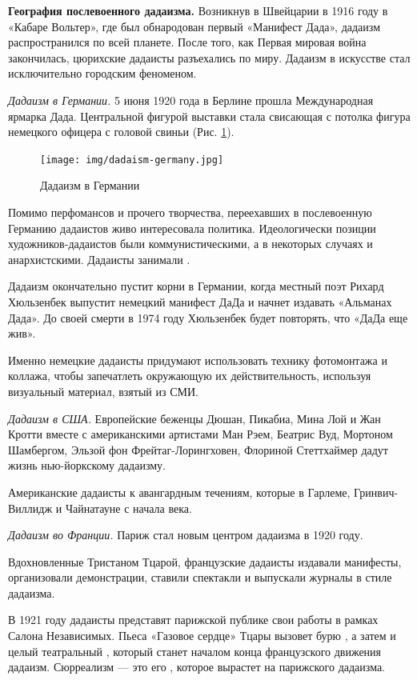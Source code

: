 \textbf{География послевоенного дадаизма.}
Возникнув в Швейцарии в 1916 году в «Кабаре Вольтер», где был обнародован первый «Манифест Дада», дадаизм распространился по всей планете. После того, как Первая мировая война закончилась, цюрихские дадаисты разъехались по миру. Дадаизм в искусстве стал исключительно городским феноменом.


\textit{Дадаизм в Германии.}
5 июня 1920 года в Берлине прошла Международная ярмарка Дада. Центральной фигурой выставки стала свисающая с потолка фигура немецкого офицера с головой свиньи (Рис. \ref{fig:damaism-germany}).

\begin{figure}[h]
    \centering
    \texttt{[image: img/dadaism-germany.jpg]}
    \caption{Дадаизм в Германии}\label{fig:damaism-germany}
\end{figure}

Помимо перфомансов и прочего творчества, переехавших в послевоенную Германию дадаистов живо интересовала политика. Идеологически позиции художников-дадаистов были коммунистическими, а в некоторых случаях и анархистскими. Дадаисты занимали .

Дадаизм окончательно пустит корни в Германии, когда местный поэт Рихард Хюльзенбек выпустит немецкий манифест ДаДа и начнет издавать «Альманах Дада». До своей смерти в 1974 году Хюльзенбек будет повторять, что «ДаДа еще жив».

Именно немецкие дадаисты придумают использовать технику фотомонтажа и коллажа, чтобы запечатлеть окружающую их действительность, используя визуальный материал, взятый из СМИ.

\textit{Дадаизм в США.}
Европейские беженцы Дюшан, Пикабиа, Мина Лой и Жан Кротти вместе с американскими артистами Ман Рэем, Беатрис Вуд, Мортоном Шамбергом, Эльзой фон Фрейтаг-Лорингховен, Флориной Стеттхаймер дадут жизнь нью-йоркскому дадаизму.

Американские дадаисты  к авангардным течениям, которые  в Гарлеме, Гринвич-Виллидж и Чайнатауне с начала века.

\textit{Дадаизм во Франции.}
Париж стал новым центром дадаизма в 1920 году.

Вдохновленные Тристаном Тцарой, французские дадаисты издавали манифесты, организовали демонстрации, ставили спектакли и выпускали журналы в стиле дадаизма.

В 1921 году дадаисты представят парижской публике свои работы в рамках Салона Независимых. Пьеса «Газовое сердце» Тцары вызовет бурю , а затем и целый театральный , который станет началом конца французского движения дадаизм. Сюрреализм --- это его , которое вырастет на  парижского дадаизма.

